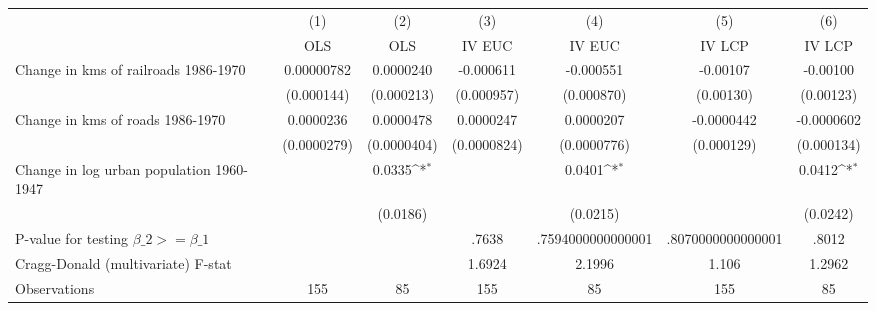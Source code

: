 {
\def\sym#1{\ifmmode^{#1}\else\(^{#1}\)\fi}
\begin{tabular}{l*{6}{c}}
\hline\hline
                &\multicolumn{1}{c}{(1)}&\multicolumn{1}{c}{(2)}&\multicolumn{1}{c}{(3)}&\multicolumn{1}{c}{(4)}&\multicolumn{1}{c}{(5)}&\multicolumn{1}{c}{(6)}\\
                &\multicolumn{1}{c}{OLS}&\multicolumn{1}{c}{OLS}&\multicolumn{1}{c}{IV EUC}&\multicolumn{1}{c}{IV EUC}&\multicolumn{1}{c}{IV LCP}&\multicolumn{1}{c}{IV LCP}\\
\hline
Change in kms of railroads 1986-1970&0.00000782         &0.0000240         &-0.000611         &-0.000551         & -0.00107         & -0.00100         \\
                &(0.000144)         &(0.000213)         &(0.000957)         &(0.000870)         &(0.00130)         &(0.00123)         \\
[1em]
Change in kms of roads 1986-1970&0.0000236         &0.0000478         &0.0000247         &0.0000207         &-0.0000442         &-0.0000602         \\
                &(0.0000279)         &(0.0000404)         &(0.0000824)         &(0.0000776)         &(0.000129)         &(0.000134)         \\
[1em]
Change in log urban population 1960-1947&                  &   0.0335\sym{*}  &                  &   0.0401\sym{*}  &                  &   0.0412\sym{*}  \\
                &                  & (0.0186)         &                  & (0.0215)         &                  & (0.0242)         \\
\hline
P-value for testing $\beta\_{2} >= \beta\_{1}$&                  &                  &    .7638         &.7594000000000001         &.8070000000000001         &    .8012         \\
Cragg-Donald (multivariate) F-stat&                  &                  &   1.6924         &   2.1996         &    1.106         &   1.2962         \\
Observations    &      155         &       85         &      155         &       85         &      155         &       85         \\
\hline\hline
\end{tabular}
}
